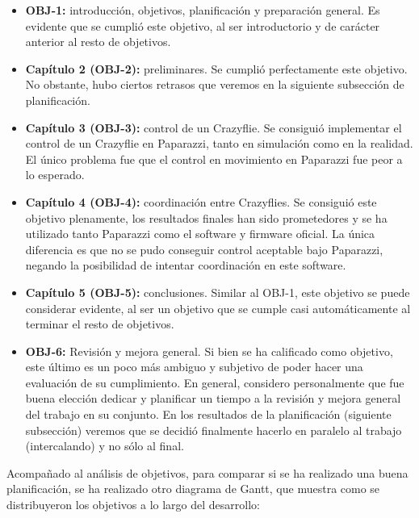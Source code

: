 \begin{itemize}
    \item \textbf{OBJ-1:} introducción, objetivos, planificación y preparación general. 
    Es evidente que se cumplió este objetivo, al ser introductorio y de carácter anterior al resto de objetivos.
    
    \item \textbf{Capítulo 2 (OBJ-2):} preliminares. 
    Se cumplió perfectamente este objetivo. No obstante,
    hubo ciertos retrasos que veremos en la siguiente subsección de planificación.

    \item \textbf{Capítulo 3 (OBJ-3):} control de un Crazyflie. 
    Se consiguió implementar el control de un Crazyflie en Paparazzi, tanto en simulación como en la realidad. 
    El único problema fue que el control en movimiento en Paparazzi fue peor a lo esperado.
    
    \item \textbf{Capítulo 4 (OBJ-4):} coordinación entre Crazyflies. 
    Se consiguió este objetivo plenamente, los resultados finales han sido prometedores y se ha utilizado tanto Paparazzi como el software y firmware oficial. 
    La única diferencia es que no se pudo conseguir control aceptable bajo Paparazzi, negando la posibilidad de intentar coordinación en este software. 

    \item \textbf{Capítulo 5 (OBJ-5):} conclusiones.
    Similar al OBJ-1, este objetivo se puede considerar evidente, al ser un objetivo que se cumple casi automáticamente al terminar el resto de objetivos.

    \item \textbf{OBJ-6:} Revisión y mejora general.
    Si bien se ha calificado como objetivo, este último es un poco más ambiguo y subjetivo de poder hacer una evaluación de su cumplimiento. 
    En general, considero personalmente que fue buena elección dedicar y planificar un tiempo a la revisión y mejora general del trabajo en su conjunto.
    En los resultados de la planificación (siguiente subsección) veremos que se decidió finalmente hacerlo en paralelo al trabajo (intercalando) y no sólo al final.
\end{itemize}

Acompañado al análisis de objetivos, para comparar si se ha realizado una buena planificación, 
se ha realizado otro diagrama de Gantt, 
que muestra como se distribuyeron los objetivos a lo largo del desarrollo:

